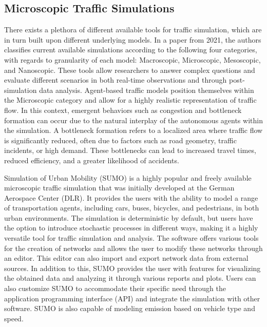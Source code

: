     \subsection{Microscopic Traffic Simulations}
        There exists a plethora of different available tools for traffic simulation, which are in turn built upon different underlying models. In a paper from 2021\cite{NGUYEN2021100486}, the authors classifies current available simulations according to the following four categories, with regards to granularity of each model: Macroscopic, Microscopic, Mesoscopic, and Nanoscopic. These tools allow researchers to answer complex questions and evaluate different scenarios in both real-time observations and through post-simulation data analysis. Agent-based traffic models position themselves within the Microscopic category and allow for a highly realistic representation of traffic flow. In this context, emergent behaviors such as congestion and bottleneck formation can occur due to the natural interplay of the autonomous agents within the simulation. A bottleneck formation refers to a localized area where traffic flow is significantly reduced, often due to factors such as road geometry, traffic incidents, or high demand. These bottlenecks can lead to increased travel times, reduced efficiency, and a greater likelihood of accidents\cite{ZENG2021125918bottleneck}.

        Simulation of Urban Mobility (SUMO)\cite{sumo-paper-2012}\cite{sumo-website} is a highly popular and freely available microscopic traffic simulation that was initially developed at the German Aerospace Center (DLR). It provides the users with the ability to model a range of transportation agents, including cars, buses, bicycles, and pedestrians, in both urban environments. The simulation is deterministic by default, but users have the option to introduce stochastic processes in different ways, making it a highly versatile tool for traffic simulation and analysis. The software offers various tools for the creation of networks and allows the user to modify these networks through an editor. This editor can also import and export network data from external sources. In addition to this, SUMO provides the user with features for visualizing the obtained data and analyzing it through various reports and plots. Users can also customize SUMO to accommodate their specific need through the application programming interface (API) and integrate the simulation with other software. SUMO is also capable of modeling emission based on vehicle type and speed.

